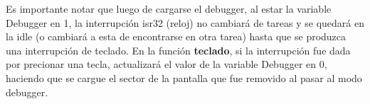 Es importante notar que luego de cargarse el debugger, al estar la variable Debugger en 1, la interrupci\'on isr32 (reloj) no cambiar\'a de tareas y 
se quedar\'a en la idle (o cambiar\'a a esta de encontrarse en otra tarea) hasta que se produzca una interrupci\'on de teclado. En la funci\'on 
\textbf{teclado}, si la interrupci\'on fue dada por precionar una tecla, actualizar\'a el valor de la variable Debugger en 0, haciendo que se 
cargue el sector de la pantalla que fue removido al pasar al modo debugger.


